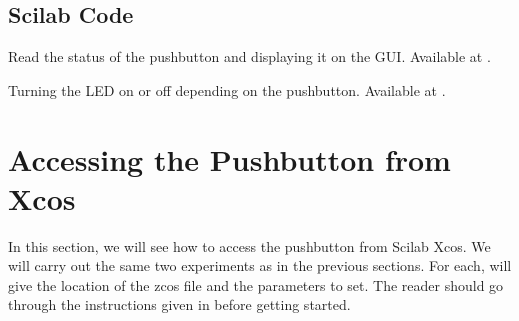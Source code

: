 \subsection{Scilab Code}
\label{sec:push-scilab-code}

\begin{scicode}
{Read the status of the pushbutton and displaying it on the GUI.  Available at
  .}
\label{sci:push-100}

\end{scicode}

\begin{scicode}
  {Turning the LED on or off depending on the pushbutton.  Available at
  .}
\label{sci:push-200}

\end{scicode}




\section{Accessing the Pushbutton from Xcos}
\label{sec:push-xcos}
In this section, we will see how to access the pushbutton from Scilab
Xcos.  We will carry out the same two experiments as in the previous
sections.  For each, will give the location of the zcos file and the
parameters to set.  The reader should go through the instructions
given in  before getting started.

